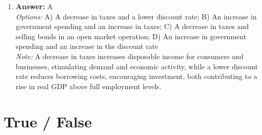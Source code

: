 \documentclass[12pt]{article}
\begin{document}
\begin{enumerate}[label=\arabic*.]
\item \textbf{Answer:} A
\\ \textit{Options:} A) A decrease in taxes and a lower discount rate; B) An increase in government spending and an increase in taxes; C) A decrease in taxes and selling bonds in an open market operation; D) An increase in government spending and an increase in the discount rate
\\ \textit{Note:} A decrease in taxes increases disposable income for consumers and businesses, stimulating demand and economic activity, while a lower discount rate reduces borrowing costs, encouraging investment, both contributing to a rise in real GDP above full employment levels.
\end{enumerate}

\section*{True / False}
\end{document}
